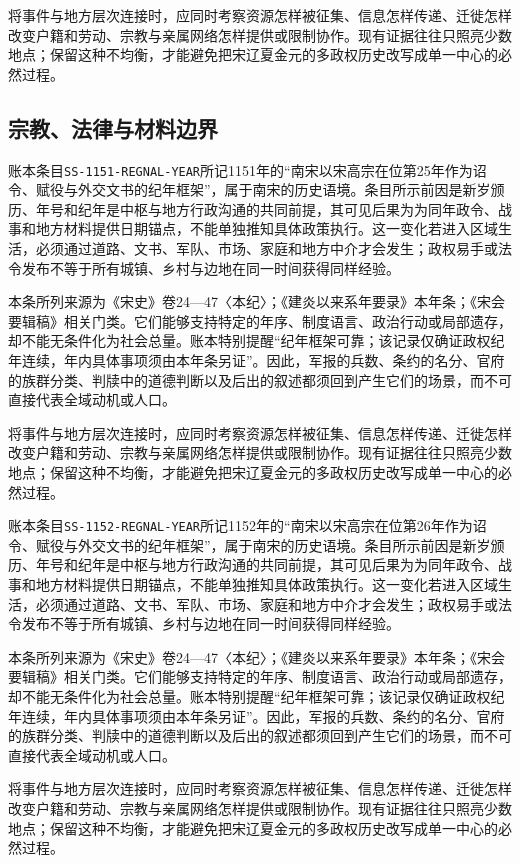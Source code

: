 将事件与地方层次连接时，应同时考察资源怎样被征集、信息怎样传递、迁徙怎样改变户籍和劳动、宗教与亲属网络怎样提供或限制协作。现有证据往往只照亮少数地点；保留这种不均衡，才能避免把宋辽夏金元的多政权历史改写成单一中心的必然过程。

\subsection{宗教、法律与材料边界}

账本条目\texttt{SS-1151-REGNAL-YEAR}所记1151年的“南宋以宋高宗在位第25年作为诏令、赋役与外交文书的纪年框架”，属于南宋的历史语境。条目所示前因是新岁颁历、年号和纪年是中枢与地方行政沟通的共同前提，其可见后果为为同年政令、战事和地方材料提供日期锚点，不能单独推知具体政策执行。这一变化若进入区域生活，必须通过道路、文书、军队、市场、家庭和地方中介才会发生；政权易手或法令发布不等于所有城镇、乡村与边地在同一时间获得同样经验。

本条所列来源为《宋史》卷24—47〈本纪〉；《建炎以来系年要录》本年条；《宋会要辑稿》相关门类。它们能够支持特定的年序、制度语言、政治行动或局部遗存，却不能无条件化为社会总量。账本特别提醒“纪年框架可靠；该记录仅确证政权纪年连续，年内具体事项须由本年条另证”。因此，军报的兵数、条约的名分、官府的族群分类、判牍中的道德判断以及后出的叙述都须回到产生它们的场景，而不可直接代表全域动机或人口。

将事件与地方层次连接时，应同时考察资源怎样被征集、信息怎样传递、迁徙怎样改变户籍和劳动、宗教与亲属网络怎样提供或限制协作。现有证据往往只照亮少数地点；保留这种不均衡，才能避免把宋辽夏金元的多政权历史改写成单一中心的必然过程。

账本条目\texttt{SS-1152-REGNAL-YEAR}所记1152年的“南宋以宋高宗在位第26年作为诏令、赋役与外交文书的纪年框架”，属于南宋的历史语境。条目所示前因是新岁颁历、年号和纪年是中枢与地方行政沟通的共同前提，其可见后果为为同年政令、战事和地方材料提供日期锚点，不能单独推知具体政策执行。这一变化若进入区域生活，必须通过道路、文书、军队、市场、家庭和地方中介才会发生；政权易手或法令发布不等于所有城镇、乡村与边地在同一时间获得同样经验。

本条所列来源为《宋史》卷24—47〈本纪〉；《建炎以来系年要录》本年条；《宋会要辑稿》相关门类。它们能够支持特定的年序、制度语言、政治行动或局部遗存，却不能无条件化为社会总量。账本特别提醒“纪年框架可靠；该记录仅确证政权纪年连续，年内具体事项须由本年条另证”。因此，军报的兵数、条约的名分、官府的族群分类、判牍中的道德判断以及后出的叙述都须回到产生它们的场景，而不可直接代表全域动机或人口。

将事件与地方层次连接时，应同时考察资源怎样被征集、信息怎样传递、迁徙怎样改变户籍和劳动、宗教与亲属网络怎样提供或限制协作。现有证据往往只照亮少数地点；保留这种不均衡，才能避免把宋辽夏金元的多政权历史改写成单一中心的必然过程。


